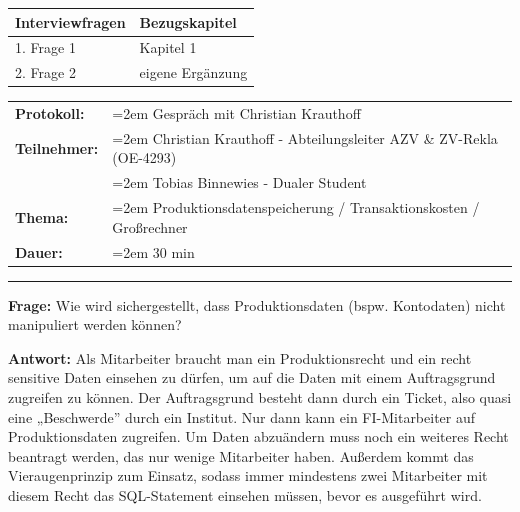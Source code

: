 
\label{Interviewleitfaden für das Interview mit Christian Krauthoff}

\begin{tabular}{|p{10cm}|p{4cm}|}
    \hline
    \textbf{Interviewfragen} & \textbf{Bezugskapitel} \\
    \hline
    1. Frage 1 & Kapitel 1 \\
    \hline
    2. Frage 2 & eigene Ergänzung \\
    \hline
    \end{tabular}

\newpage

\label{appendix: Anhang 3}


\begin{tabular}{p{2.5 cm}>{\raggedright\arraybackslash\hangindent=2em}p{11.8 cm}}
    \textbf{Protokoll:} & Gespräch mit Christian Krauthoff \\
    \textbf{Teilnehmer:} & Christian Krauthoff - Abteilungsleiter AZV \break \& ZV-Rekla (OE-4293) \\
    & Tobias Binnewies - Dualer Student \\
    \textbf{Thema:} & Produktionsdatenspeicherung / Transaktionskosten / Großrechner \\
    \textbf{Dauer:} & 30 min
    \end{tabular}
    

\bigbreak
\noindent\rule[1ex]{\textwidth}{1pt} %
\bigbreak

\textbf{Frage:} 
\label{i1:f1}
Wie wird sichergestellt, dass Produktionsdaten (bspw. Kontodaten) nicht manipuliert werden können?


\textbf{Antwort:} 
Als Mitarbeiter braucht man ein Produktionsrecht und ein recht sensitive Daten einsehen zu dürfen, um auf die Daten mit einem Auftragsgrund zugreifen zu können. Der Auftragsgrund besteht dann durch ein Ticket, also quasi eine „Beschwerde” durch ein Institut.
Nur dann kann ein FI-Mitarbeiter auf Produktionsdaten zugreifen.
Um Daten abzuändern muss noch ein weiteres Recht beantragt werden, das nur wenige Mitarbeiter haben.
Außerdem kommt das Vieraugenprinzip zum Einsatz, sodass immer mindestens zwei Mitarbeiter mit diesem Recht das SQL-Statement einsehen müssen, bevor es ausgeführt wird.

